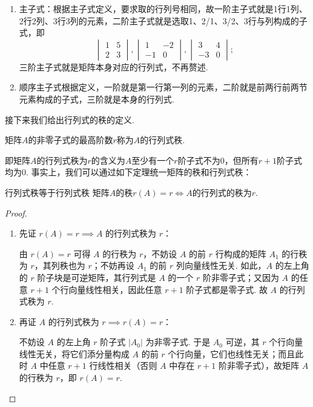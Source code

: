 \begin{solution}
\begin{enumerate}
        \item 主子式：根据主子式定义，要求取的行列号相同，故一阶主子式就是1行1列、2行2列、3行3列的元素，二阶主子式就是选取1、2/1、3/2、3行与列构成的子式，即
              \[\begin{vmatrix}
                      1 & 5 \\ 2 & 3
                  \end{vmatrix},\begin{vmatrix}
                      1 & -2 \\ -1 & 0
                  \end{vmatrix},\begin{vmatrix}
                      3 & 4 \\ -3 & 0
                  \end{vmatrix};\]
              三阶主子式就是矩阵本身对应的行列式，不再赘述.

        \item 顺序主子式根据定义，一阶就是第一行第一列的元素，二阶就是前两行前两节元素构成的子式，三阶就是本身的行列式.
    \end{enumerate}
\end{solution}

接下来我们给出行列式的秩的定义.
\begin{definition}{}{}
    矩阵$A$的非零子式的最高阶数$r$称为$A$的行列式秩.
\end{definition}
即矩阵$A$的行列式秩为$r$的含义为$A$至少有一个$r$阶子式不为0，但所有$r+1$阶子式均为0. 事实上，我们可以通过如下定理统一矩阵的秩和行列式秩：
\begin{theorem}{}{行列式秩等于行列式秩}
    矩阵$A$的秩$r(A)=r \iff A$的行列式的秩为$r$.
\end{theorem}
\begin{proof}
    \begin{enumerate}
        \item 先证 $r(A)=r \implies A$ 的行列式秩为 $r$：

            由 $r(A) = r$ 可得 $A$ 的行秩为 $r$，不妨设 $A$ 的前 $r$ 行构成的矩阵 $A_1$ 的行秩为 $r$，其列秩也为 $r$；不妨再设 $A_1$ 的前 $r$ 列向量线性无关. 如此，$A$ 的左上角的 $r$ 阶子块是可逆矩阵，其行列式是 $A$ 的一个 $r$ 阶非零子式；又因为 $A$ 的任意 $r+1$ 个行向量线性相关，因此任意 $r+1$ 阶子式都是零子式. 故 $A$ 的行列式秩为 $r$.

        \item 再证 $A$ 的行列式秩为 $r \implies r(A)=r$：

            不妨设 $A$ 的左上角 $r$ 阶子式 $|A_0|$ 为非零子式. 于是 $A_0$ 可逆，其 $r$ 个行向量线性无关，将它们添分量构成 $A$ 的前 $r$ 个行向量，它们也线性无关；而且此时 $A$ 中任意 $r+1$ 行线性相关（否则 $A$ 中存在 $r+1$ 阶非零子式），故矩阵 $A$ 的行秩为 $r$，即 $r(A)=r$.
    \end{enumerate}
\end{proof}

